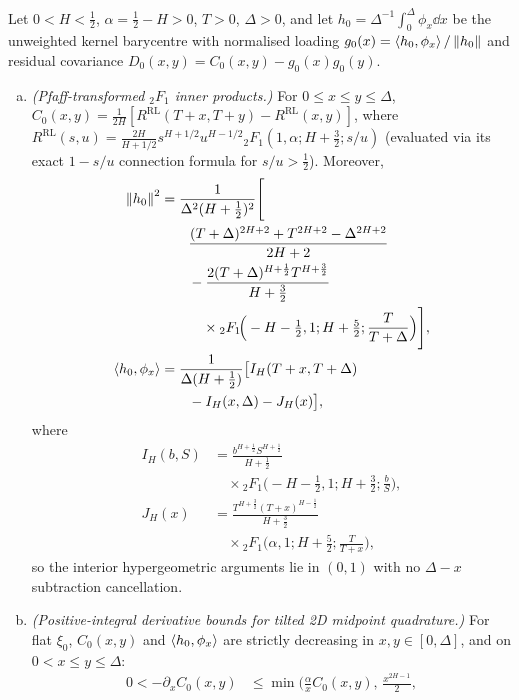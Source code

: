\begin{proposition}\label{prop:arb}
Let $0<H<\tfrac12$, $\alpha=\tfrac12-H>0$, $T>0$, $\Delta>0$, and let $h_0=\Delta^{-1}\int_0^\Delta\phi_x\dd x$
be the unweighted kernel barycentre with normalised loading $g_0(x)=\left\langle h_0,\phi_x\right\rangle/\left\lVert h_0\right\rVert$ and
residual covariance $D_0(x,y)=C_0(x,y)-g_0(x)g_0(y)$.
\begin{enumerate}[(a)]
\item \emph{(Pfaff-transformed ${}_2F_1$ inner products.)} For $0\le x\le y\le\Delta$,
  $C_0(x,y)=\frac{1}{2H}[R^{\mathrm{RL}}(T+x,T+y)-R^{\mathrm{RL}}(x,y)]$, where
  $R^{\mathrm{RL}}(s,u)=\frac{2H}{H+1/2}s^{H+1/2}u^{H-1/2}{}_2F_1(1,\alpha;H+\tfrac32;s/u)$ (evaluated via
  its exact $1-s/u$ connection formula for $s/u>\tfrac12$). Moreover,
  \begin{align}
    \left\lVert h_0\right\rVert^2&=\frac{1}{\Delta^2(H+\tfrac12)^2}\Bigg[\nonumber\\
      &\qquad\frac{(T+\Delta)^{2H+2}+T^{2H+2}-\Delta^{2H+2}}{2H+2}\nonumber\\
      &\qquad-\frac{2(T+\Delta)^{H+\frac12}T^{H+\frac32}}{H+\tfrac32}\nonumber\\
      &\qquad\quad\times{}_2F_1\!\Big(-H-\tfrac12,1;H+\tfrac52;\frac{T}{T+\Delta}\Big)\Bigg],\label{eq:nh2_pfaff}\\
    \left\langle h_0,\phi_x\right\rangle&=\frac{1}{\Delta(H+\tfrac12)}\big[I_H(T+x,T+\Delta)\nonumber\\
      &\qquad-I_H(x,\Delta)-J_H(x)\big],\label{eq:hkx_pfaff}
  \end{align}
  where
  \begin{align*}
    I_H(b,S)&=\frac{b^{H+\frac12}S^{H+\frac12}}{H+\tfrac12}\\
    &\quad\times{}_2F_1\!\Big(-H-\tfrac12,1;H+\tfrac32;\frac{b}{S}\Big),\\
    J_H(x)&=\frac{T^{H+\frac32}(T+x)^{H-\frac12}}{H+\tfrac32}\\
    &\quad\times{}_2F_1\!\Big(\alpha,1;H+\tfrac52;\frac{T}{T+x}\Big),
  \end{align*}
  so the interior hypergeometric arguments lie in $(0,1)$ with no $\Delta-x$ subtraction cancellation.
\item \emph{(Positive-integral derivative bounds for tilted 2D midpoint quadrature.)} For flat $\xi_0$,
  $C_0(x,y)$ and $\left\langle h_0,\phi_x\right\rangle$ are strictly decreasing in $x,y\in[0,\Delta]$, and on $0<x\le y\le\Delta$:
  \begin{align*}
    0<-\partial_x C_0(x,y)&\le\min\!\Big(\frac{\alpha}{x}C_0(x,y),\,\frac{x^{2H-1}}{2},\\

\end{align*}
\end{enumerate}
\end{proposition}
